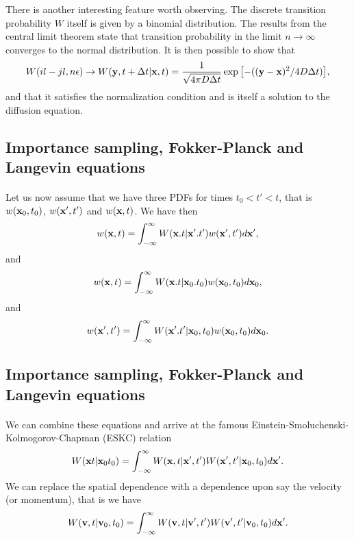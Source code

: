 \documentclass[%
twoside,                 %
final,                   %
10pt]{article}
\begin{document}
{{{{{{There is another interesting feature worth observing. The discrete transition probability $W$
itself is given by a binomial distribution.
The results from the central limit theorem state that 
transition probability in the limit $n\rightarrow \infty$ converges to the normal 
distribution. It is then possible to show that
\[
    W(il-jl,n\epsilon)\rightarrow W({\bf y},t+\Delta t|{\bf x},t)=
    \frac{1}{\sqrt{4\pi D\Delta t}}\exp{\left[-(({\bf y}-{\bf x})^2/4D\Delta t)\right]},
\]
and that it satisfies the normalization condition and is itself a solution
to the diffusion equation.




\subsection{Importance sampling, Fokker-Planck and Langevin equations}

\paragraph{}
Let us now assume that we have three PDFs for times $t_0 < t' < t$, that is
$w({\bf x}_0,t_0)$, $w({\bf x}',t')$ and $w({\bf x},t)$.
We have then  
\[
   w({\bf x},t)= \int_{-\infty}^{\infty} W({\bf x}.t|{\bf x}'.t')w({\bf x}',t')d{\bf x}',
\]
and
\[
   w({\bf x},t)= \int_{-\infty}^{\infty} W({\bf x}.t|{\bf x}_0.t_0)w({\bf x}_0,t_0)d{\bf x}_0,
\]
and
\[
   w({\bf x}',t')= \int_{-\infty}^{\infty} W({\bf x}'.t'|{\bf x}_0,t_0)w({\bf x}_0,t_0)d{\bf x}_0.
\]




\subsection{Importance sampling, Fokker-Planck and Langevin equations}

\paragraph{}
We can combine these equations and arrive at the famous Einstein-Smoluchenski-Kolmogorov-Chapman (ESKC) relation
\[
 W({\bf x}t|{\bf x}_0t_0)  = \int_{-\infty}^{\infty} W({\bf x},t|{\bf x}',t')W({\bf x}',t'|{\bf x}_0,t_0)d{\bf x}'.
\]
We can replace the spatial dependence with a dependence upon say the velocity
(or momentum), that is we have
\[
 W({\bf v},t|{\bf v}_0,t_0)  = \int_{-\infty}^{\infty} W({\bf v},t|{\bf v}',t')W({\bf v}',t'|{\bf v}_0,t_0)d{\bf x}'.
\]




}}}}}}
\end{document}
